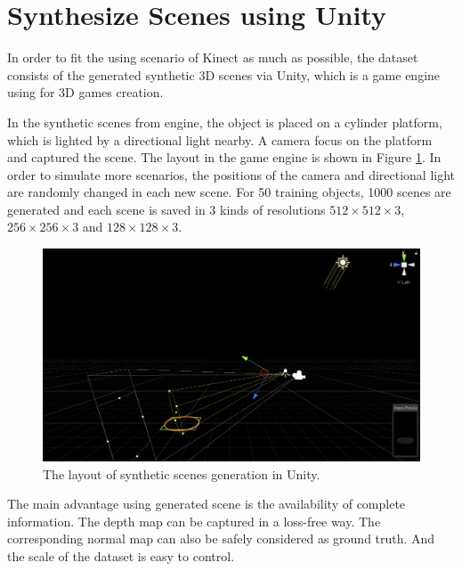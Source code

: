 \documentclass[border=15pt, multi, tikz]{article}
\begin{document}
\section{Synthesize Scenes using Unity}
In order to fit the using scenario of Kinect as much as possible, the dataset consists of the generated synthetic 3D scenes via Unity, which is a game engine using for 3D games creation. 

In the synthetic scenes from engine, the object is placed on a cylinder platform, which is lighted by a directional light nearby. A camera focus on the platform and captured the scene. The layout in the game engine is shown in Figure \ref{fig:unity-workplace}. In order to simulate more scenarios, the positions of the camera and directional light are randomly changed in each new scene. For 50 training objects, 1000 scenes are generated and each scene is saved in 3 kinds of resolutions $ 512\times512\times3 $, $ 256\times256\times3 $ and $ 128\times128\times3 $.

\begin{figure}[h!]
	\centering
	\includegraphics[width=.8\textwidth]{./Figures/unity-workplace.PNG}
	\caption{The layout of synthetic scenes generation in Unity.}
	\label{fig:unity-workplace}
\end{figure}

The main advantage using generated scene is the availability of complete information. The depth map can be captured in a loss-free way. The corresponding normal map can also be safely considered as ground truth. And the scale of the dataset is easy to control.
\end{document}
